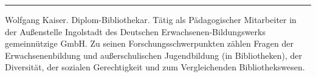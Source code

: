 \begin{center}\rule{3in}{0.4pt}\end{center}

Wolfgang Kaiser. Diplom-Bibliothekar. Tätig als Pädagogischer
Mitarbeiter in der Außenstelle Ingolstadt des Deutschen
Erwachsenen-Bildungswerks gemeinnützige GmbH. Zu seinen
Forschungsschwerpunkten zählen Fragen der Erwachsenenbildung und
außerschulischen Jugendbildung (in Bibliotheken), der Diversität, der
sozialen Gerechtigkeit und zum Vergleichenden Bibliothekswesen.
